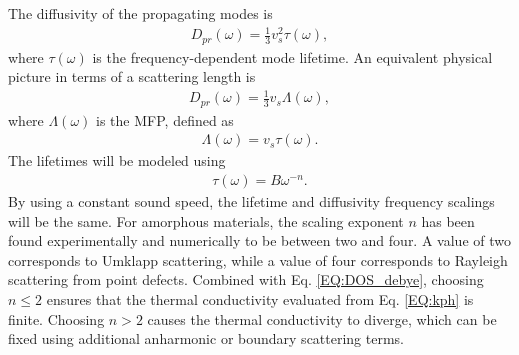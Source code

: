 \documentclass[aps,prb,onecolumn,preprint,superscriptaddress,footinbib,amsmath,amssymb,floatfix]{revtex4}
\begin{document}
The diffusivity of the propagating modes is    
\begin{equation}\label{EQ:Dtau}
\begin{split}
D_{pr}(\omega) = \frac{1}{3}v^2_s\tau(\omega),
\end{split}
\end{equation}
where $\tau(\omega)$ is the frequency-dependent mode 
lifetime.\cite{ziman_electrons_2001} An equivalent physical 
picture in terms of a scattering length is
\begin{equation}\label{EQ:DLambda}
\begin{split}
D_{pr}(\omega) = \frac{1}{3}v_s \Lambda(\omega),
\end{split}
\end{equation}
where $\Lambda(\omega)$ is the MFP, defined as 
\begin{equation}\label{EQ:Lambda}
\begin{split}
\Lambda(\omega) = v_{s} \tau(\omega).
\end{split}
\end{equation}
The lifetimes will be modeled using 
\begin{equation}\label{EQ:tauw2}
\begin{split}
\tau(\omega) = B \omega^{-n}.
\end{split}
\end{equation}
By using a constant sound speed, the lifetime and diffusivity 
frequency scalings will be the same. 
For amorphous materials, the scaling exponent $n$ 
has been found experimentally and numerically to be 
between two and four.
\cite{
feldman_thermal_1993,morath_phonon_1996,benassi_evidence_1996,
feldman_numerical_1999,taraskin_determination_1999,
taraskin_propagation_2000,
ruocco_high-frequency_2001,horbach_high_2001,
matic_sound_2001,
feldman_calculations_2002,ruffle_observation_2003,
masciovecchio_evidence_2006,schirmacher_acoustic_2007,
christie_vibrational_2007,xu_energy_2009,
liu_high_2009,ganter_rayleigh_2010,
vitelli_heat_2010,
baldi_sound_2010,yang_anomalously_2010,baldi_elastic_2011,
he_heat_2011,ayrinhac_subterahertz_2011,
baldi_emergence_2013}
A value of two corresponds to 
Umklapp scattering,\cite{callaway_model_1959} while a value of four 
corresponds to 
Rayleigh scattering from point defects.\cite{klemens_scattering_1955}
Combined with Eq. \eqref{EQ:DOS_debye}, choosing $n\le2$ ensures 
that the thermal conductivity evaluated from Eq. \eqref{EQ:kph} is finite. 
Choosing $n>2$ causes the thermal conductivity to diverge,   
which can be fixed using additional anharmonic
\cite{feldman_thermal_1993,feldman_numerical_1999} 
or boundary scattering terms.
\cite{cahill_thermal_1994,liu_high_2009,yang_anomalously_2010}
\end{document}
